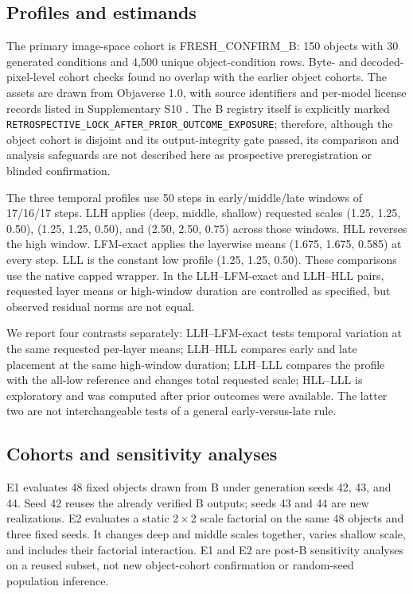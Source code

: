\documentclass[times,twocolumn,final]{elsarticle}
\begin{document}
\subsection{Profiles and estimands}

The primary image-space cohort is FRESH\_CONFIRM\_B: 150 objects with 30 generated conditions and 4,500 unique object-condition rows. Byte- and decoded-pixel-level cohort checks found no overlap with the earlier object cohorts. The assets are drawn from Objaverse 1.0, with source identifiers and per-model license records listed in Supplementary S10 \cite{objaverse2023}. The B registry itself is explicitly marked \texttt{RETROSPECTIVE\_LOCK\_AFTER\_PRIOR\_OUTCOME\_EXPOSURE}; therefore, although the object cohort is disjoint and its output-integrity gate passed, its comparison and analysis safeguards are not described here as prospective preregistration or blinded confirmation.

The three temporal profiles use 50 steps in early/middle/late windows of 17/16/17 steps. LLH applies (deep, middle, shallow) requested scales (1.25, 1.25, 0.50), (1.25, 1.25, 0.50), and (2.50, 2.50, 0.75) across those windows. HLL reverses the high window. LFM-exact applies the layerwise means (1.675, 1.675, 0.585) at every step. LLL is the constant low profile (1.25, 1.25, 0.50). These comparisons use the native capped wrapper. In the LLH--LFM-exact and LLH--HLL pairs, requested layer means or high-window duration are controlled as specified, but observed residual norms are not equal.

We report four contrasts separately: LLH--LFM-exact tests temporal variation at the same requested per-layer means; LLH--HLL compares early and late placement at the same high-window duration; LLH--LLL compares the profile with the all-low reference and changes total requested scale; HLL--LLL is exploratory and was computed after prior outcomes were available. The latter two are not interchangeable tests of a general early-versus-late rule.

\subsection{Cohorts and sensitivity analyses}

E1 evaluates 48 fixed objects drawn from B under generation seeds 42, 43, and 44. Seed 42 reuses the already verified B outputs; seeds 43 and 44 are new realizations. E2 evaluates a static 2\,$\times$\,2 scale factorial on the same 48 objects and three fixed seeds. It changes deep and middle scales together, varies shallow scale, and includes their factorial interaction. E1 and E2 are post-B sensitivity analyses on a reused subset, not new object-cohort confirmation or random-seed population inference.
\end{document}
